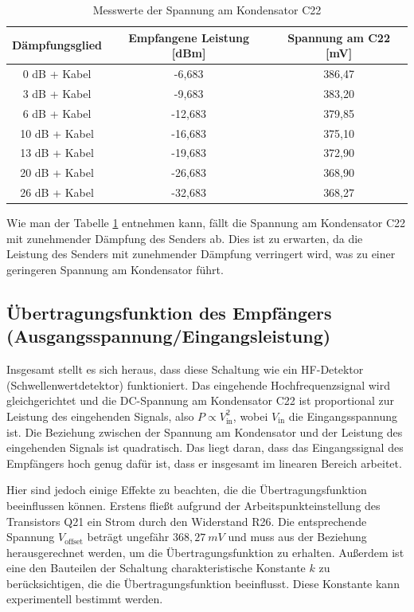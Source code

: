\begin{table}[H]
    \centering
    \begin{tabular}{|c|c|c|}
        \hline
        Dämpfungsglied  & Empfangene Leistung [dBm] & Spannung am C22 [mV] \\ \hline
        0 dB + Kabel    & -6,683 & 386,47                 \\ \hline
        3 dB + Kabel    & -9,683 & 383,20                 \\ \hline
        6 dB + Kabel    & -12,683 & 379,85                 \\ \hline
        10 dB + Kabel   & -16,683 & 375,10                 \\ \hline
        13 dB + Kabel   & -19,683 & 372,90                 \\ \hline
        20 dB + Kabel   & -26,683 & 368,90                 \\ \hline
        26 dB + Kabel   & -32,683 & 368,27                 \\ \hline
    \end{tabular}
    \caption{Messwerte der Spannung am Kondensator C22}
    \label{tab:spannung}
\end{table}

Wie man der Tabelle \ref{tab:spannung} entnehmen kann, fällt die Spannung am Kondensator C22 mit zunehmender Dämpfung des Senders ab. Dies ist zu erwarten, da die Leistung des Senders mit zunehmender Dämpfung verringert wird, was zu einer geringeren Spannung am Kondensator führt.

\subsection{Übertragungsfunktion des Empfängers (Ausgangsspannung/Eingangsleistung)}
Insgesamt stellt es sich heraus, dass diese Schaltung wie ein HF-Detektor (Schwellenwertdetektor) funktioniert. Das eingehende Hochfrequenzsignal wird gleichgerichtet und die DC-Spannung am Kondensator C22 ist proportional zur Leistung des eingehenden Signals,
also \( P \propto V_\text{in}^2 \), wobei \( V_\text{in} \) die Eingangsspannung ist. Die Beziehung zwischen der Spannung am Kondensator und der Leistung des eingehenden Signals ist quadratisch. Das liegt daran, dass das Eingangssignal des Empfängers hoch genug dafür ist, dass er insgesamt im linearen Bereich arbeitet. 

Hier sind jedoch einige Effekte zu beachten, die die Übertragungsfunktion beeinflussen können. Erstens fließt aufgrund der Arbeitspunkteinstellung des Transistors Q21 ein Strom durch den Widerstand R26. Die entsprechende Spannung \textbf{$V_\text{offset}$} beträgt ungefähr $368,27~mV$ und muss aus der Beziehung herausgerechnet werden, um die Übertragungsfunktion zu erhalten. Außerdem ist eine den Bauteilen der Schaltung charakteristische Konstante \( k \) zu berücksichtigen, die die Übertragungsfunktion beeinflusst. Diese Konstante kann experimentell bestimmt werden.

